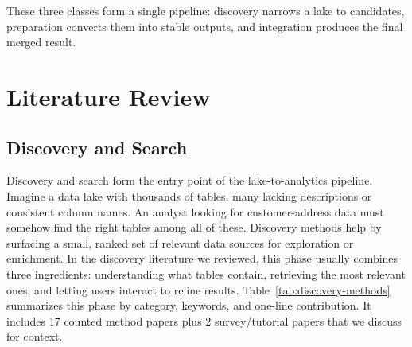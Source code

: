 \documentclass[sigconf]{acmart}
\begin{document}
These three classes form a single pipeline: discovery narrows a lake to candidates, preparation converts them into stable outputs, and integration produces the final merged result.



\section{Literature Review}

\subsection{Discovery and Search}
Discovery and search form the entry point of the lake-to-analytics pipeline. Imagine a data lake with thousands of tables, many lacking descriptions or consistent column names. An analyst looking for customer-address data must somehow find the right tables among all of these. Discovery methods help by surfacing a small, ranked set of relevant data sources for exploration or enrichment. In the discovery literature we reviewed, this phase usually combines three ingredients: understanding what tables contain, retrieving the most relevant ones, and letting users interact to refine results. Table~\ref{tab:discovery-methods} summarizes this phase by category, keywords, and one-line contribution. It includes 17 counted method papers plus 2 survey/tutorial papers that we discuss for context.
\end{document}
